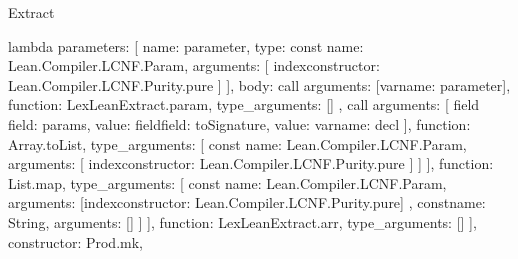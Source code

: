 \begin{lexlean}{Extract}
\begin{toolingmodule}
{{{{{{{{{{                                  lambda{
                                    parameters: [
                                      {
                                        name: parameter,
                                        type: const{
                                          name: Lean.Compiler.LCNF.Param,
                                          arguments: [
                                            index{constructor: Lean.Compiler.LCNF.Purity.pure}
                                          ]
                                        }
                                      }
                                    ],
                                    body: call{
                                      arguments: [var{name: parameter}],
                                      function: LexLeanExtract.param,
                                      type_arguments: []
                                    }
                                  },
                                  call{
                                    arguments: [
                                      field{
                                        field: params,
                                        value: field{field: toSignature, value: var{name: decl}}
                                      }
                                    ],
                                    function: Array.toList,
                                    type_arguments: [
                                      const{
                                        name: Lean.Compiler.LCNF.Param,
                                        arguments: [
                                          index{constructor: Lean.Compiler.LCNF.Purity.pure}
                                        ]
                                      }
                                    ]
                                  }
                                ],
                                function: List.map,
                                type_arguments: [
                                  const{
                                    name: Lean.Compiler.LCNF.Param,
                                    arguments: [index{constructor: Lean.Compiler.LCNF.Purity.pure}]
                                  },
                                  const{name: String, arguments: []}
                                ]
                              }
                            ],
                            function: LexLeanExtract.arr,
                            type_arguments: []
                          }
                        ],
                        constructor: Prod.mk,
}}}}}}}}
\end{toolingmodule}
\end{lexlean}
